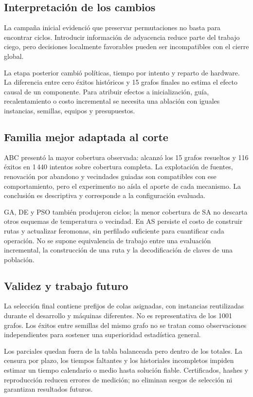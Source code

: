 \subsection{Interpretación de los cambios}
La campaña inicial evidenció que preservar permutaciones no basta para encontrar ciclos. Introducir información de adyacencia reduce parte del trabajo ciego, pero decisiones localmente favorables pueden ser incompatibles con el cierre global.

La etapa posterior cambió políticas, tiempo por intento y reparto de hardware. La diferencia entre cero éxitos históricos y 15 grafos finales no estima el efecto causal de un componente. Para atribuir efectos a inicialización, guía, recalentamiento o costo incremental se necesita una ablación con iguales instancias, semillas, equipos y presupuestos.

\subsection{Familia mejor adaptada al corte}
ABC presentó la mayor cobertura observada: alcanzó los 15 grafos resueltos y 116 éxitos en 1\,440 intentos sobre cobertura completa. La explotación de fuentes, renovación por abandono y vecindades guiadas son compatibles con ese comportamiento, pero el experimento no aísla el aporte de cada mecanismo. La conclusión es descriptiva y corresponde a la configuración evaluada.

GA, DE y PSO también produjeron ciclos; la menor cobertura de SA no descarta otros esquemas de temperatura o vecindad. En AS persiste el costo de construir rutas y actualizar feromonas, sin perfilado suficiente para cuantificar cada operación. No se supone equivalencia de trabajo entre una evaluación incremental, la construcción de una ruta y la decodificación de claves de una población.

\subsection{Validez y trabajo futuro}
La selección final contiene prefijos de colas asignadas, con instancias reutilizadas durante el desarrollo y máquinas diferentes. No es representativa de los 1001 grafos. Los éxitos entre semillas del mismo grafo no se tratan como observaciones independientes para sostener una superioridad estadística general.

Los parciales quedan fuera de la tabla balanceada pero dentro de los totales. La censura por plazo, los tiempos faltantes y los historiales incompletos impiden estimar un tiempo calendario o medio hasta solución fiable. Certificados, hashes y reproducción reducen errores de medición; no eliminan sesgos de selección ni garantizan resultados futuros.

